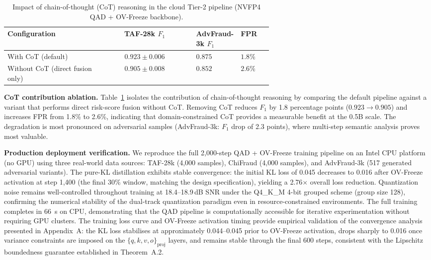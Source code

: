 \documentclass[final,5p,times,number]{elsarticle}
\begin{document}
\begin{table}[!t]
\centering
\caption{Impact of chain-of-thought (CoT) reasoning in the cloud Tier-2 pipeline (NVFP4 QAD + OV-Freeze backbone).}
\label{tab:cot-ablation-en}
\small
\renewcommand{\arraystretch}{1.2}
\begin{tabular}{>{\raggedright\arraybackslash}p{0.35\linewidth}c>{\centering\arraybackslash}p{0.15\linewidth}>{\centering\arraybackslash}p{0.12\linewidth}}
\toprule
\textbf{Configuration} & \textbf{TAF-28k $F_1$} & \textbf{AdvFraud-3k $F_1$}& \textbf{FPR} \\
\midrule
With CoT (default) & $\mathbf{0.923 \pm 0.006}$ & $\mathbf{0.875}$ & $\mathbf{1.8\%}$ \\
Without CoT (direct fusion only) & $0.905 \pm 0.008$ & $0.852$ & $2.6\%$ \\
\bottomrule
\end{tabular}
\end{table}

\medskip
\noindent\textbf{CoT contribution ablation.} Table~\ref{tab:cot-ablation-en} isolates the contribution of chain-of-thought reasoning by comparing the default pipeline against a variant that performs direct risk-score fusion without CoT. Removing CoT reduces $F_1$ by 1.8 percentage points ($0.923\!\rightarrow\!0.905$) and increases FPR from 1.8\% to 2.6\%, indicating that domain-constrained CoT provides a measurable benefit at the 0.5B scale. The degradation is most pronounced on adversarial samples (AdvFraud-3k: $F_1$ drop of 2.3 points), where multi-step semantic analysis proves most valuable.

\medskip
\noindent\textbf{Production deployment verification.}
We reproduce the full 2,000-step QAD + OV-Freeze training pipeline on an Intel CPU platform (no GPU) using three real-world data sources: TAF-28k (4,000 samples), ChiFraud (4,000 samples), and AdvFraud-3k (517 generated adversarial variants). The pure-KL distillation exhibits stable convergence: the initial KL loss of 0.045 decreases to 0.016 after OV-Freeze activation at step 1,400 (the final 30\% window, matching the design specification), yielding a 2.76$\times$ overall loss reduction. Quantization noise remains well-controlled throughout training at 18.4--18.9\,dB SNR under the Q4\_K\_M 4-bit grouped scheme (group size 128), confirming the numerical stability of the dual-track quantization paradigm even in resource-constrained environments. The full training completes in 66~s on CPU, demonstrating that the QAD pipeline is computationally accessible for iterative experimentation without requiring GPU clusters. The training loss curve and OV-Freeze activation timing provide empirical validation of the convergence analysis presented in Appendix~A: the KL loss stabilises at approximately 0.044--0.045 prior to OV-Freeze activation, drops sharply to 0.016 once variance constraints are imposed on the $\{q,k,v,o\}_{\mathrm{proj}}$ layers, and remains stable through the final 600 steps, consistent with the Lipschitz boundedness guarantee established in Theorem~A.2.
\end{document}
